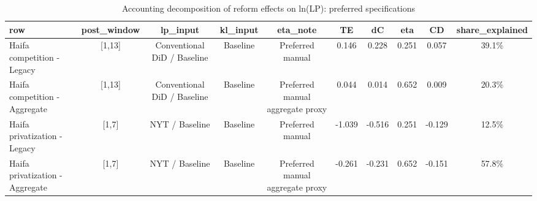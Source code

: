 \begin{table}[!htbp]
  \centering
  \caption{Accounting decomposition of reform effects on ln(LP): preferred specifications}
  \label{tab:model2\_summary}
  \scriptsize
  \begin{tabular}{lccccccccc}
    \toprule
    row & post\_window & lp\_input & kl\_input & eta\_note & TE & dC & eta & CD & share\_explained \\
    \midrule
    Haifa competition - Legacy & [1,13] & Conventional DiD / Baseline & Baseline & Preferred manual & 0.146 & 0.228 & 0.251 & 0.057 & 39.1\% \\
    Haifa competition - Aggregate & [1,13] & Conventional DiD / Baseline & Baseline & Preferred manual aggregate proxy & 0.044 & 0.014 & 0.652 & 0.009 & 20.3\% \\
    Haifa privatization - Legacy & [1,7] & NYT / Baseline & Baseline & Preferred manual & -1.039 & -0.516 & 0.251 & -0.129 & 12.5\% \\
    Haifa privatization - Aggregate & [1,7] & NYT / Baseline & Baseline & Preferred manual aggregate proxy & -0.261 & -0.231 & 0.652 & -0.151 & 57.8\% \\
    \bottomrule
  \end{tabular}
\end{table}
